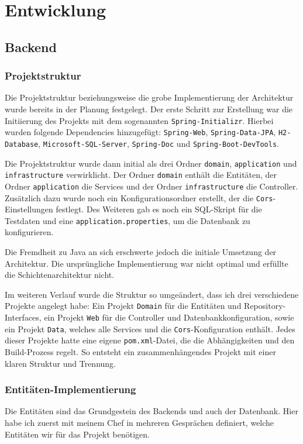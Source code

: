 \chapter{Entwicklung}
\section{Backend}
\subsection{Projektstruktur}
Die Projektstruktur beziehungsweise die grobe Implementierung der Architektur wurde bereits in der Planung festgelegt. 
Der erste Schritt zur Erstellung war die Initiierung des Projekts mit dem sogenannten \texttt{Spring-Initializr}. 
Hierbei wurden folgende Dependencies hinzugefügt: \texttt{Spring-Web}, \texttt{Spring-Data-JPA}, \texttt{H2-Database}, \texttt{Microsoft-SQL-Server}, \texttt{Spring-Doc} und \texttt{Spring-Boot-DevTools}.

Die Projektstruktur wurde dann initial als drei Ordner \texttt{domain}, \texttt{application} und \texttt{infrastructure} verwirklicht.
Der Ordner \texttt{domain} enthält die Entitäten, der Ordner \texttt{application} die Services und der Ordner \texttt{infrastructure} die Controller.
Zusätzlich dazu wurde noch ein Konfigurationsordner erstellt, der die \texttt{Cors}-Einstellungen festlegt. 
Des Weiteren gab es noch ein SQL-Skript für die Testdaten und eine \texttt{application.properties}, um die Datenbank zu konfigurieren.

Die Fremdheit zu Java an sich erschwerte jedoch die initiale Umsetzung der Architektur. Die ursprüngliche Implementierung war nicht optimal und erfüllte
die Schichtenarchitektur nicht.

Im weiteren Verlauf wurde die Struktur so umgeändert, dass ich drei verschiedene Projekte angelegt habe: 
Ein Projekt \texttt{Domain} für die Entitäten und Repository-Interfaces, ein Projekt \texttt{Web} für die Controller und Datenbankkonfiguration, sowie ein Projekt \texttt{Data}, 
welches alle Services und die \texttt{Cors}-Konfiguration enthält. Jedes dieser Projekte hatte eine eigene \texttt{pom.xml}-Datei, die 
die Abhängigkeiten und den Build-Prozess regelt. So entsteht ein zusammenhängendes Projekt mit einer klaren Struktur und Trennung.

\subsection{Entitäten-Implementierung}
Die Entitäten sind das Grundgestein des Backends und auch der Datenbank.
Hier habe ich zuerst mit meinem Chef in mehreren Gesprächen definiert, welche Entitäten wir für das Projekt benötigen.

